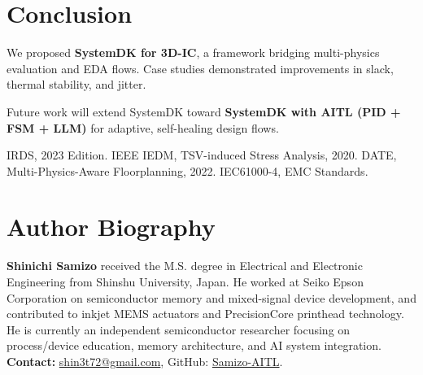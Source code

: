 \documentclass[conference]{IEEEtran}
\begin{document}
\section{Conclusion}
We proposed \textbf{SystemDK for 3D-IC}, a framework bridging multi-physics evaluation and EDA flows. Case studies demonstrated improvements in slack, thermal stability, and jitter. 

Future work will extend SystemDK toward \textbf{SystemDK with AITL (PID + FSM + LLM)} for adaptive, self-healing design flows.

\begin{thebibliography}{1}

\IEEEtriggercmd{\enlargethispage{-2.5cm}} %

 IRDS, 2023 Edition.
 IEEE IEDM, TSV-induced Stress Analysis, 2020.
 DATE, Multi-Physics-Aware Floorplanning, 2022.
 IEC61000-4, EMC Standards.
\end{thebibliography}

\section*{Author Biography}
\noindent\textbf{Shinichi Samizo}
received the M.S. degree in Electrical and Electronic Engineering from Shinshu University, Japan.
He worked at Seiko Epson Corporation on semiconductor memory and mixed-signal device development, and contributed to inkjet MEMS actuators and PrecisionCore printhead technology.
He is currently an independent semiconductor researcher focusing on process/device education, memory architecture, and AI system integration.\\
\textbf{Contact:} \href{mailto:shin3t72@gmail.com}{shin3t72@gmail.com}, GitHub: \href{https://github.com/Samizo-AITL}{Samizo-AITL}.
\end{document}
